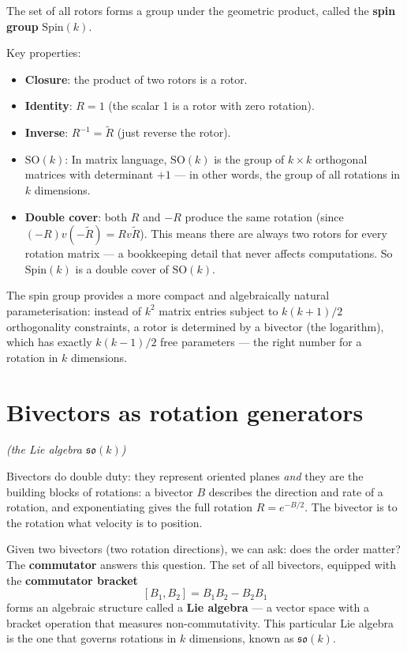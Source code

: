 \documentclass[11pt, twoside, openright]{memoir}
\newcommand{\rev}[1]{\widetilde{#1}} %
\begin{document}
The set of all rotors forms a group under the geometric product,
called the \textbf{spin group} $\mathrm{Spin}(k)$.

Key properties:
\begin{itemize}[nosep]
\item \textbf{Closure}: the product of two rotors is a rotor.
\item \textbf{Identity}: $R = 1$ (the scalar 1 is a rotor with zero rotation).
\item \textbf{Inverse}: $R^{-1} = \rev{R}$ (just reverse the rotor).
\item \textbf{$\mathrm{SO}(k)$}: In matrix language, $\mathrm{SO}(k)$ is the group of $k \times k$
  orthogonal matrices with determinant $+1$ --- in other words, the group of all rotations in $k$ dimensions.
\item \textbf{Double cover}: both $R$ and $-R$ produce the same rotation (since $(-R)v(-\widetilde{R}) = Rv\widetilde{R}$). This means there are always two rotors for every rotation matrix --- a bookkeeping detail that never affects computations. So $\mathrm{Spin}(k)$ is a
  double cover of $\mathrm{SO}(k)$.
\end{itemize}

The spin group provides a
more compact and algebraically natural parameterisation: instead of
$k^2$ matrix entries subject to $k(k+1)/2$ orthogonality constraints,
a rotor is determined by a bivector (the logarithm), which has exactly
$k(k-1)/2$ free parameters --- the right number for a rotation in $k$
dimensions.

\section{Bivectors as rotation generators}
\textit{(the Lie algebra $\mathfrak{so}(k)$)}

Bivectors do double duty: they represent oriented planes \emph{and}
they are the building blocks of rotations: a bivector $B$ describes the direction and rate of a rotation, and exponentiating gives the full rotation $R = e^{-B/2}$. The bivector is to the rotation what velocity is to position.

Given two bivectors (two rotation directions), we can ask: does the order matter? The \textbf{commutator} answers this question. The set of all
bivectors, equipped with the \textbf{commutator bracket}
\[
  [B_1, B_2] = B_1 B_2 - B_2 B_1
\]
forms an algebraic structure called a \textbf{Lie algebra} --- a vector space with a bracket operation that measures non-commutativity. This particular Lie algebra is the one that governs rotations in $k$ dimensions, known as $\mathfrak{so}(k)$.
\end{document}
